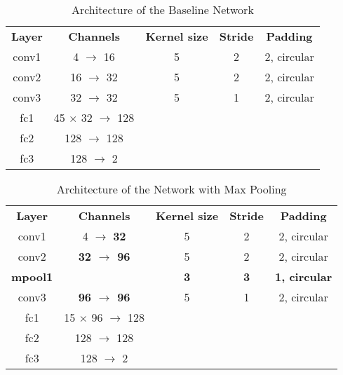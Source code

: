\begin{table}[htbp]
	\caption{Architecture of the Baseline Network}
	\begin{center}
		\begin{tabular}{|c|c|c|c|c|}
			\hline
			\textbf{Layer}&\textbf{Channels} &\textbf{Kernel size} &\textbf{Stride} &\textbf{Padding}\\
			\cline{1-5}
			conv1 &  4 $\rightarrow$ 16 & 5 & 2 & 2, circular \\ \hline
			conv2 & 16 $\rightarrow$ 32 & 5 & 2 & 2, circular \\ \hline
			conv3 & 32 $\rightarrow$  			 32 & 5 & 1 & 2, circular \\ \hline
			fc1 &   45 $\times$ 32 $\rightarrow$ 128 &  &  &  \\ \hline
			fc2 &  128 $\rightarrow$ 128 &  &  &  \\ \hline
			fc3 &  128 $\rightarrow$   2 &  &  &  \\ \hline
		\end{tabular}
		\label{tab: baseline}
	\end{center}
\end{table}

\begin{table}[htbp]
	\caption{Architecture of the Network with Max Pooling}
	\begin{center}
		\begin{tabular}{|c|c|c|c|c|}
			\hline
			\textbf{Layer}&\textbf{Channels} &\textbf{Kernel size} &\textbf{Stride} &\textbf{Padding}\\
			\cline{1-5}
			conv1  &   4 $\rightarrow$  \bfseries	32 & 5 & 2 & 2, circular \\ \hline
			conv2  & \bfseries 32 $\rightarrow$  	96 & 5 & 2 & 2, circular \\ \hline
			\bfseries mpool1 & 					   & \bfseries 3	& \bfseries 3 & \bfseries 1, circular \\ 
			\hline			
			conv3  & \bfseries 96 $\rightarrow$  	96 & 5 & 1 & 2, circular \\ \hline
			fc1    & 15 $\times$ 96 $\rightarrow$ 128 &  &  &  \\ \hline
			fc2    & 128 $\rightarrow$ 128 &  &  &  \\ \hline
			fc3    & 128 $\rightarrow$   2 &  &  &  \\ \hline
		\end{tabular}
		\label{tab: maxpool}
	\end{center}
\end{table}

